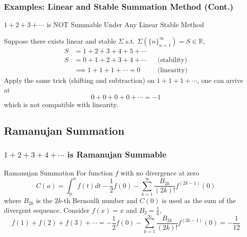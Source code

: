 \documentclass{beamer}
\begin{document}

\begin{frame}
\frametitle{Examples: Linear and Stable Summation Method (Cont.)}

\begin{block}{$ 1 + 2 + 3 + \cdots $ is NOT Summable Under Any Linear Stable Method}

Suppose there exists linear and stable $\Sigma$ s.t. $ \Sigma( \{n\}_{n=1}^{\infty} ) = S \in \mathbb{R} $, 
\begin{align*}
 S &= 1 + 2 + 3 + 4 + 5 + \cdots \\ 
 S &= 0 + 1 + 2 + 3 + 4 + \cdots && \text{(stability)} \\ 
&\implies 1 + 1 + 1 + \cdots = 0 && \text{(linearity)}
\end{align*}
Apply the same trick (shifting and subtraction) on $ 1 + 1 + 1 + \cdots $, one can arrive at 
$$ 0 + 0 + 0 + 0 + \cdots = -1 $$
which is not compatible with linearity. 
\end{block}

\end{frame}


\subsection{Ramanujan Summation}

\begin{frame}
\frametitle{$ 1 + 2 + 3 + 4 + \cdots $ is Ramanujan Summable}

\begin{block}{Ramanujan Summation}
For function $f$ with no divergence at zero 
$$ C(a) = \int_0^a f(t) dt - \frac{1}{2} f(0) - \sum_{k=1}^{\infty} \frac{B_{2k}}{(2k)!} f^{(2k-1)} (0) $$
where $B_{2k}$ is the $2k$-th Bernoulli number and $C(0)$ is used as the sum of the divergent sequence. Consider $ f(x) = x $ and $B_2 = \frac{1}{6}$, 
$$ f(1) + f(2) + f(3) + \cdots = -\frac{1}{2} f(0) - \sum_{k=1}^{\infty} \frac{B_{2k}}{(2k)!} f^{(2k-1)} (0) = - \frac{1}{12} $$
\end{block}

\end{frame}

\end{document}
